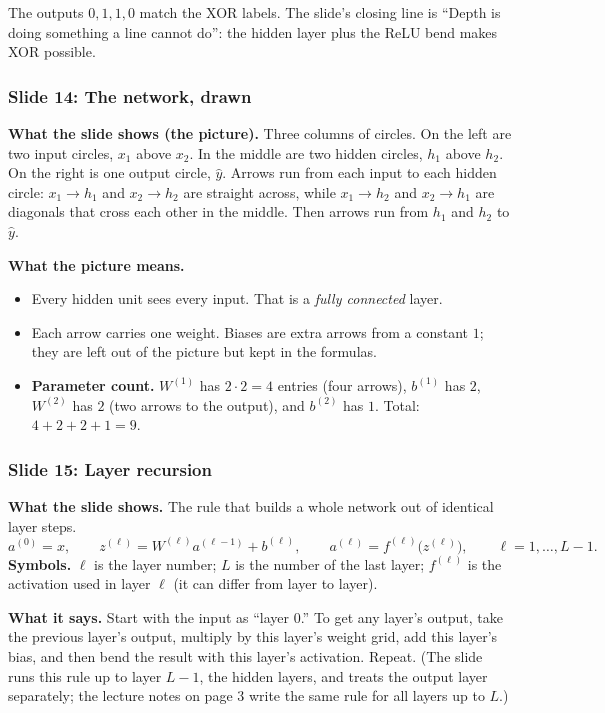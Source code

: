 The outputs $0,1,1,0$ match the XOR labels. The slide's closing line is ``Depth is doing something a line cannot do'': the hidden layer plus the ReLU bend makes XOR possible.

\subsubsection{Slide 14: The network, drawn}

\textbf{What the slide shows (the picture).} Three columns of circles. On the left are two input circles, $x_1$ above $x_2$. In the middle are two hidden circles, $h_1$ above $h_2$. On the right is one output circle, $\hat{y}$. Arrows run from each input to each hidden circle: $x_1\to h_1$ and $x_2\to h_2$ are straight across, while $x_1\to h_2$ and $x_2\to h_1$ are diagonals that cross each other in the middle. Then arrows run from $h_1$ and $h_2$ to $\hat{y}$.

\textbf{What the picture means.}
\begin{itemize}
\item Every hidden unit sees every input. That is a \emph{fully connected} layer.
\item Each arrow carries one weight. Biases are extra arrows from a constant $1$; they are left out of the picture but kept in the formulas.
\item \textbf{Parameter count.} $W^{(1)}$ has $2\cdot2=4$ entries (four arrows), $b^{(1)}$ has $2$, $W^{(2)}$ has $2$ (two arrows to the output), and $b^{(2)}$ has $1$. Total: $4+2+2+1 = 9$.
\end{itemize}

\subsubsection{Slide 15: Layer recursion}

\textbf{What the slide shows.} The rule that builds a whole network out of identical layer steps.
\[
a^{(0)} = x, \qquad z^{(\ell)} = W^{(\ell)}a^{(\ell-1)} + b^{(\ell)}, \qquad a^{(\ell)} = f^{(\ell)}\big(z^{(\ell)}\big), \qquad \ell = 1,\dots,L-1.
\]
\textbf{Symbols.} $\ell$ is the layer number; $L$ is the number of the last layer; $f^{(\ell)}$ is the activation used in layer $\ell$ (it can differ from layer to layer).

\textbf{What it says.} Start with the input as ``layer 0.'' To get any layer's output, take the previous layer's output, multiply by this layer's weight grid, add this layer's bias, and then bend the result with this layer's activation. Repeat. (The slide runs this rule up to layer $L-1$, the hidden layers, and treats the output layer separately; the lecture notes on page 3 write the same rule for all layers up to $L$.)

